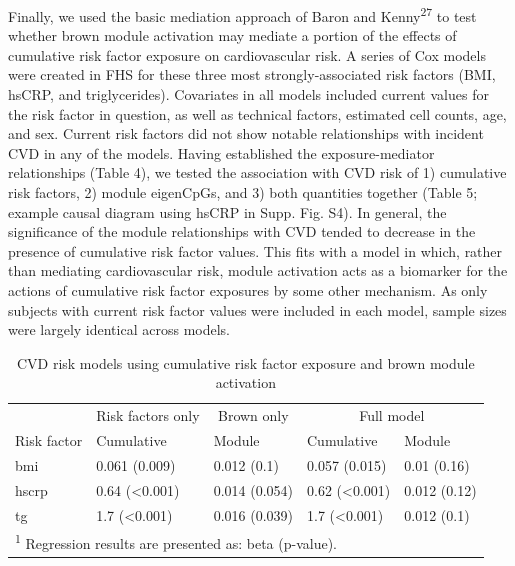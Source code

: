 \documentclass[]{article}
\theoremstyle{definition}
\theoremstyle{definition}
\theoremstyle{definition}
\theoremstyle{remark}
\begin{document}
Finally, we used the basic mediation approach of Baron and
Kenny\textsuperscript{27} to test whether brown module activation may
mediate a portion of the effects of cumulative risk factor exposure on
cardiovascular risk. A series of Cox models were created in FHS for
these three most strongly-associated risk factors (BMI, hsCRP, and
triglycerides). Covariates in all models included current values for the
risk factor in question, as well as technical factors, estimated cell
counts, age, and sex. Current risk factors did not show notable
relationships with incident CVD in any of the models. Having established
the exposure-mediator relationships (Table 4), we tested the association
with CVD risk of 1) cumulative risk factors, 2) module eigenCpGs, and 3)
both quantities together (Table 5; example causal diagram using hsCRP in
Supp. Fig. S4). In general, the significance of the module relationships
with CVD tended to decrease in the presence of cumulative risk factor
values. This fits with a model in which, rather than mediating
cardiovascular risk, module activation acts as a biomarker for the
actions of cumulative risk factor exposures by some other mechanism. As
only subjects with current risk factor values were included in each
model, sample sizes were largely identical across models.

\begin{table}

\caption{\label{tab:module-mediation}CVD risk models using cumulative risk factor exposure and brown module activation}
\centering
\begin{tabular}[t]{lllll}
\toprule
\multicolumn{1}{c}{} & \multicolumn{1}{c}{Risk factors only} & \multicolumn{1}{c}{Brown only} & \multicolumn{2}{c}{Full model} \\
\cmidrule(l{2pt}r{2pt}){2-2} \cmidrule(l{2pt}r{2pt}){3-3} \cmidrule(l{2pt}r{2pt}){4-5}
Risk factor & Cumulative & Module & Cumulative & Module\\
\midrule
bmi & 0.061 (0.009) & 0.012 (0.1) & 0.057 (0.015) & 0.01 (0.16)\\
hscrp & 0.64 (<0.001) & 0.014 (0.054) & 0.62 (<0.001) & 0.012 (0.12)\\
tg & 1.7 (<0.001) & 0.016 (0.039) & 1.7 (<0.001) & 0.012 (0.1)\\
\bottomrule
\multicolumn{5}{l}{\textsuperscript{1} Regression results are presented as: beta (p-value).}\\
\end{tabular}
\end{table}
\end{document}
